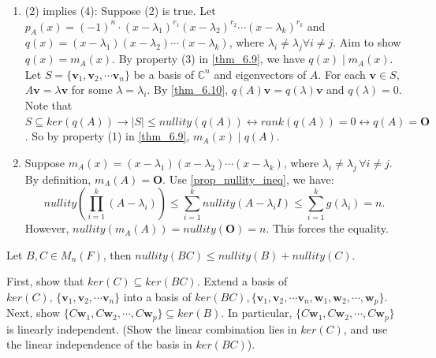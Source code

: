 \documentclass[12pt]{article}
\begin{document}
\begin{pf}
\begin{enumerate}
    \item (2) implies (4): Suppose (2) is true. Let $p_A(x)=(-1)^n\cdot(x-\lambda_1)^{r_1}(x-\lambda_2)^{r_2}\cdots(x-\lambda_k)^{r_k}$ and $q(x)=(x-\lambda_1)(x-\lambda_2)\cdots (x-\lambda_k)$, where $\lambda_i\neq \lambda_j \forall i\ne j$.
    Aim to show $q(x)=m_A(x)$. By property (3) in \eqref{thm_6.9}, we have $q(x)\mid m_A(x)$.
    Let $S = \{\mathbf{v}_1, \mathbf{v}_2, \cdots \mathbf{v}_n\}$ be a basis of $\mathbb{C}^n$ and eigenvectors of $A$.
    For each $\mathbf{v}\in S$, $A\mathbf{v}=\lambda\mathbf{v}$ for some $\lambda=\lambda_i$.
    By \eqref{thm_6.10}, $q(A)\mathbf{v}=q(\lambda)\mathbf{v}$ and $q(\lambda)=0$.
    Note that $S\subseteq ker(q(A)) \rightarrow |S|\le nullity(q(A)) \leftrightarrow rank(q(A))=0 \leftrightarrow q(A)=\mathbf{O}$.
    So by property (1) in \eqref{thm_6.9}, $m_A(x)\mid q(A).$ 

    \item Suppose $m_A(x)=(x-\lambda_1)(x-\lambda_2)\cdots (x-\lambda_k)$, where $\lambda_i\neq \lambda_j\, \forall i\ne j$.
    By definition, $m_A(A)=\mathbf{O}.$ Use \eqref{prop_nullity_ineq}, we have:
    \[nullity(\prod_{i=1}^{k}(A-\lambda_i))\leq \sum_{i=1}^{k}nullity(A-\lambda_i I)\le \sum_{i=1}^{k}g(\lambda_i)=n.\]
    However, $nullity(m_A(A))=nullity(\mathbf{O})=n$. This forces the equality.
\end{enumerate}
\end{pf}

\begin{proposition}
    Let $B,C\in M_n(F)$, then $nullity(BC)\le nullity(B)+nullity(C)$.
    \label{prop_nullity_ineq}
\end{proposition}

\begin{pf}
    First, show that $ker(C)\subseteq ker(BC)$. Extend a basis of $ker(C),\,\{\mathbf{v}_1, \mathbf{v}_2, \cdots \mathbf{v}_n\}$ into a basis of $ker(BC), \{\mathbf{v}_1, \mathbf{v}_2, \cdots \mathbf{v}_n, \mathbf{w}_1,\mathbf{w}_2,\cdots, \mathbf{w}_p\}$.\\
    Next, show $\{C\mathbf{w}_1,C\mathbf{w}_2,\cdots, C\mathbf{w}_p\}\subseteq ker(B)$.
    In particular,  $\{C\mathbf{w}_1,C\mathbf{w}_2,\cdots, C\mathbf{w}_p\}$ is linearly independent. (Show the linear combination lies in $ker(C)$, and use the linear independence of the basis in $ker(BC)$).
\end{pf}
\end{document}
